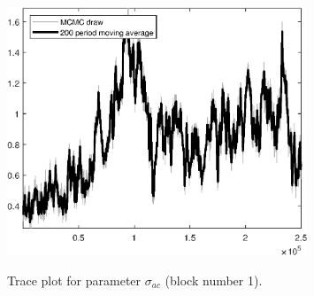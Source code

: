 \begin{figure}[H]
\centering
  \includegraphics[width=0.8\textwidth]{BRS_aggregate/graphs/TracePlot_sigma_ac_blck_1}\\
    \caption{Trace plot for parameter ${\sigma_{ac}}$ (block number 1).}
\end{figure}
